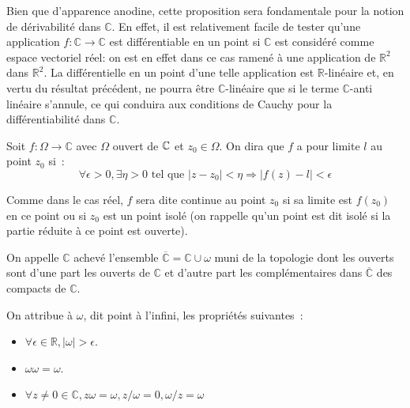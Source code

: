 Bien que d'apparence anodine, cette proposition sera fondamentale pour la notion
de dérivabilité dans $\mathbb{C}$. En effet, il est relativement facile de
tester qu'une application $f \colon \mathbb{C} \to \mathbb{C}$ est
différentiable en un point si $\mathbb{C}$ est considéré comme espace vectoriel
réel: on est en effet dans ce cas ramené à une application de $\mathbb{R}^2$ dans  $\mathbb{R}^2$. La différentielle en un point d'une telle application est
$\mathbb{R}$-linéaire et, en vertu du résultat précédent, ne pourra être
$\mathbb{C}$-linéaire que si le terme $\mathbb{C}$-anti linéaire s'annule, ce
qui conduira aux conditions de Cauchy pour la différentiabilité dans
$\mathbb{C}$.


\begin{fdefn}
Soit $f : \Omega \to \mathbb{C}$ avec $\Omega$ ouvert de $\mathbb{C}$ et $z_0 \in \Omega$.
On dira que $f$ a pour limite $l$ au point $z_0$ si~:
\[
\forall \epsilon > 0, \exists \eta > 0 \mbox{ tel que } |z-z_0| < \eta \Rightarrow
|f(z)-l| < \epsilon 
\]
\end{fdefn}
Comme dans le cas réel, $f$ sera dite continue au point $z_0$ si sa
limite est $f(z_0)$ en ce point ou si $z_0$ est un point isolé (on
rappelle qu'un point est dit isolé si la partie réduite à ce point est
ouverte).
\begin{fdefn}
On appelle $\mathbb{C}$ achevé l'ensemble $\overline{\mathbb{C}} = \mathbb{C} \cup \omega$
muni de la topologie dont les ouverts sont d'une part les ouverts de
$\mathbb{C}$ et d'autre part les complémentaires dans
$\overline{\mathbb{C}}$ des compacts de $\mathbb{C}$.
\end{fdefn}

On attribue à $\omega$, dit point à l'infini, les propriétés
suivantes~:
\begin{itemize}
\item $\forall \epsilon \in \mathbb{R},  |\omega| > \epsilon$.
\item $\omega \omega = \omega$.
\item $\forall z \neq 0 \in \mathbb{C}, z \omega = \omega, z / \omega
  = 0, \omega /z  = \omega$
\end{itemize}

